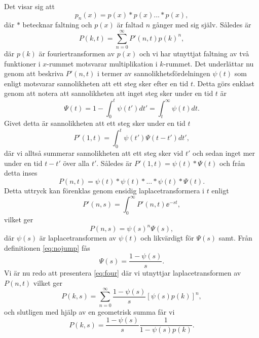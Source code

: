 Det visar sig att 
\begin{equation}
p_n(x) = p(x)*p(x)...*p(x),
\end{equation}
där $*$ betecknar faltning och $p(x)$ är faltad $n$ gånger med sig själv.  Således är 
\begin{equation}\label{eq:Pfour}
P(k,t) =\sum_{n=0}^{\infty} P'(n,t)p(k)^n,
\end{equation}
där $p(k)$ är fouriertransformen av $p(x)$ och vi har utnyttjat faltning av två funktioner i $x$-rummet motsvarar multiplikation i $k$-rummet. Det underlättar nu genom att beskriva $P'(n,t)$ i termer av sannolikhetsfördelningen $\psi (t)$ som enligt motsvarar sannolikheten att ett steg sker efter en tid $t$. Detta görs enklast genom att notera att sannolikheten att inget steg sker under en tid $t$ är 
\begin{equation}\label{eq:nojump}
\Psi (t) = 1-\int_0^t \psi(t')dt' = \int_t^{\infty} \psi(t)dt. 
\end{equation}
Givet detta är sannolikheten att ett steg sker under en tid $t$
\begin{equation}
P'(1,t) = \int_0^t\psi(t')\Psi(t-t')dt',
\end{equation}
där vi alltså summerar sannolikheten att ett steg sker vid $t'$ och sedan inget mer under en tid $t-t'$ över alla $t'$. Således är $P'(1,t) = \psi(t)*\Psi(t)$ och från detta inses
\begin{equation}
P(n,t) = \psi(t)*\psi(t)*...*\psi(t)*\Psi(t).
\end{equation}
Detta uttryck kan förenklas genom ensidig laplacetransformera i $t$ enligt 
\begin{equation}
P'(n,s) = \int_0^\infty P'(n,t)\ee^{-st},
\end{equation}
vilket ger 
\begin{equation}
P(n,s) = \psi(s)^n\Psi(s),
\end{equation}
där $\psi(s)$ är laplacetransformen av $\psi(t)$ och likvärdigt för $\Psi(s)$ samt. Från definitionen \eqref{eq:nojump} fås 
\begin{equation}
\Psi(s) = \frac{1-\psi(s)}{s}.
\end{equation}
Vi är nu redo att presentera \eqref{eq:four} där vi utnyttjar laplacetransformen av $P(n,t)$ vilket ger 
\begin{equation}
P(k,s) = \sum_{n=0}^{\infty} \frac{1-\psi(s)}{s}[\psi(s)p(k)]^n,
\end{equation}
och slutligen med hjälp av en geometrisk summa får vi 
\begin{equation}\label{eq:master}
P(k,s) = \frac{1-\psi(s)}{s}\frac{1}{1-\psi(s)p(k)}.
\end{equation}

